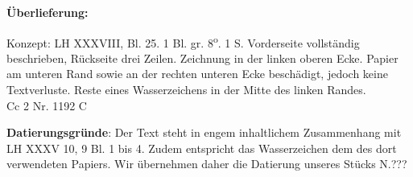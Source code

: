 ﻿      
               
                \begin{ledgroupsized}[r]{120mm}
                \footnotesize 
                \pstart             
                \noindent\textbf{\"{U}berlieferung:}   
                \pend
                \end{ledgroupsized}
            
              
                            \begin{ledgroupsized}[r]{114mm}
                            \footnotesize 
                            \pstart \parindent -6mm
                            Konzept: LH XXXVIII, Bl. 25. 1 Bl. gr. 8\textsuperscript{o}. 1  S. Vorderseite vollst\"{a}ndig beschrieben, R\"{u}ckseite drei Zeilen. Zeichnung in der linken oberen Ecke. Papier am unteren Rand sowie an der rechten unteren Ecke besch\"{a}digt, jedoch keine Textverluste. Reste eines Wasserzeichens in der Mitte des linken Randes. \\ Cc 2 Nr. 1192 C \pend
                            \end{ledgroupsized}
                \vspace*{5mm}
                \begin{ledgroup}
                \footnotesize 
                \pstart
            \noindent\footnotesize{\textbf{Datierungsgr\"{u}nde}: Der Text steht in engem inhaltlichem Zusammenhang mit LH XXXV 10, 9 Bl. 1 bis 4. Zudem entspricht das Wasserzeichen dem des dort verwendeten Papiers. Wir \"{u}bernehmen daher die Datierung unseres St\"{u}cks N.???}
                \pend
                \end{ledgroup}
            
                \vspace*{8mm}
                \pstart 
                \normalsize

